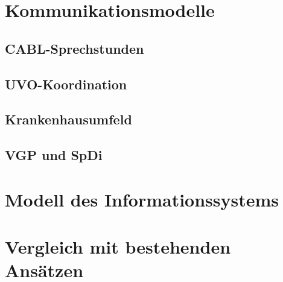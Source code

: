 \section{Kommunikationsmodelle}


\subsection{CABL-Sprechstunden}

\subsection{UVO-Koordination}

\subsection{Krankenhausumfeld}

\subsection{VGP und SpDi}


\section{Modell des Informationssystems}


\section{Vergleich mit bestehenden Ansätzen}
